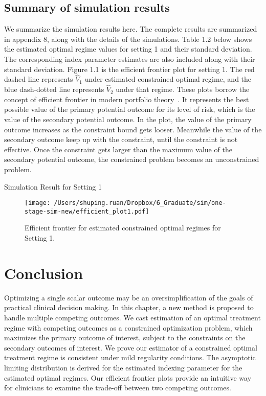 \documentclass[12pt]{article}
\newcommand{\wh}{\widehat}
\begin{document}
\subsection{Summary of simulation results}
We summarize the simulation results here. The complete results are summarized in appendix 8, along with the details of the simulations. Table 1.2 below shows the estimated optimal regime values for setting 1 and their standard deviation. The corresponding index parameter estimates are also included along with their standard deviation. Figure 1.1 is the efficient frontier plot for setting 1. The red dashed line represents $\wh{V}_1$ under estimated constrained optimal regime, and the blue dash-dotted line represents $\wh{V}_2$ under that regime. These plots borrow the concept of efficient frontier in modern portfolio theory~\cite{Markowitz1952}. It represents the best possible value of the primary potential outcome for its level of risk, which is the value of the secondary potential outcome. In the plot, the value of the primary outcome increases as the constraint bound gets looser. Meanwhile the value of the secondary outcome keep up with the constraint, until the constraint is not effective. Once the constraint gets larger than the maximum value of the secondary potential outcome, the constrained problem becomes an unconstrained problem. \\

\begin{table}[!htbp]
	\centering
	{\tt
		
	}
	\caption {Simulation Result for Setting 1}
\end{table} 

\begin{figure}[!htb]
	\centering
	\texttt{[image: /Users/shuping.ruan/Dropbox/6\_Graduate/sim/one-stage-sim-new/efficient\_plot1.pdf]}
	\caption{Efficient frontier for estimated constrained optimal regimes for Setting 1.}
	\label{fig:1}
\end{figure}


\section{Conclusion}
Optimizing a single scalar outcome may be an oversimplification of the goals of practical clinical decision making. In this chapter, a new method is proposed to handle multiple competing outcomes. We cast estimation of an optimal treatment regime with competing outcomes as a constrained optimization problem, which maximizes the primary outcome of interest, subject to the constraints on the secondary outcomes of interest. We prove our estimator of a constrained optimal treatment regime is consistent under mild regularity conditions. The asymptotic limiting distribution is derived for the estimated indexing parameter for the estimated optimal regimes. Our efficient frontier plots provide an intuitive way for clinicians to examine the trade-off between two competing outcomes. 
\end{document}
